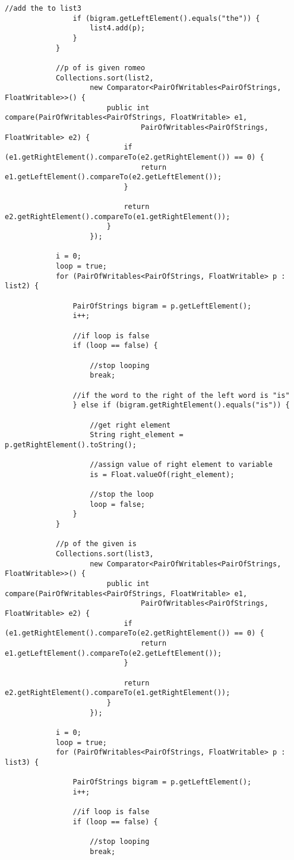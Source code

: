 \documentclass{article} %
\begin{document}
\begin{lstlisting}[style=Java]
				//add the to list3
				if (bigram.getLeftElement().equals("the")) {
					list4.add(p);
				}
			}

			//p of is given romeo
			Collections.sort(list2,
					new Comparator<PairOfWritables<PairOfStrings, FloatWritable>>() {
						public int compare(PairOfWritables<PairOfStrings, FloatWritable> e1,
								PairOfWritables<PairOfStrings, FloatWritable> e2) {
							if (e1.getRightElement().compareTo(e2.getRightElement()) == 0) {
								return e1.getLeftElement().compareTo(e2.getLeftElement());
							}

							return e2.getRightElement().compareTo(e1.getRightElement());
						}
					});

			i = 0;
			loop = true;
			for (PairOfWritables<PairOfStrings, FloatWritable> p : list2) {
				
				PairOfStrings bigram = p.getLeftElement();
				i++;
				
				//if loop is false
				if (loop == false) {
				
					//stop looping
					break;
				
				//if the word to the right of the left word is "is"
				} else if (bigram.getRightElement().equals("is")) {
				
					//get right element
					String right_element = p.getRightElement().toString();
					
					//assign value of right element to variable
					is = Float.valueOf(right_element); 
					
					//stop the loop
					loop = false;
				}
			}

			//p of the given is
			Collections.sort(list3,
					new Comparator<PairOfWritables<PairOfStrings, FloatWritable>>() {
						public int compare(PairOfWritables<PairOfStrings, FloatWritable> e1,
								PairOfWritables<PairOfStrings, FloatWritable> e2) {
							if (e1.getRightElement().compareTo(e2.getRightElement()) == 0) {
								return e1.getLeftElement().compareTo(e2.getLeftElement());
							}

							return e2.getRightElement().compareTo(e1.getRightElement());
						}
					});

			i = 0;
			loop = true;
			for (PairOfWritables<PairOfStrings, FloatWritable> p : list3) {
				
				PairOfStrings bigram = p.getLeftElement();
				i++;

				//if loop is false
				if (loop == false) {
				
					//stop looping
					break;
				

\end{lstlisting}
\end{document}
